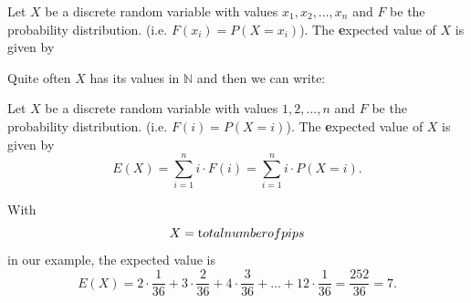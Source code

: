 \documentclass[twoside,11pt,a4paper]{article}
\newif\ifEN \ENtrue	                %
\def\tr|#1|#2|{\ifEN #2\else #1\fi}     %
\newenvironment{ttile}[1]{\begin{tcolorbox}[colback=tile,sharp corners,title=#1]}{\end{tcolorbox}}
\def\N{\mathbb{N}}
\def\vsp{\vspace{5mm}}
\theoremstyle{definition}
\begin{document}
\begin{ttile}{\tr|Erwartungswert|Expected value|}
  \tr|Sei $X$ eine diskrete Zufallsvariable mit den Werten $x_1,x_2,\ldots, x_n$ 
   und $F$ ihre Verteilungsfunktion (d.h. $F(x_i)=P(X=x_i)$). Der \textbf{Erwartungswert} von $X$ is dann definiert durch
|Let $X$ be a discrete random variable with values $x_1,x_2,\ldots, x_n$ 
and $F$ be the probability distribution. (i.e.  $F(x_i)=P(X=x_i)$). The \textbf{expected value} of $X$  is given by|
\end{ttile}

\tr|Oft hat $X$ Werte in $\N$ und dann kann man die Definition einfacher schreiben: 
|Quite often $X$ has its values in $\N$ and then we can write: |
\begin{ttile}{\tr|Erwartungswert vereinfacht|Expected value simpliefied|}
  \tr|Sei $X$ eine diskrete Zufallsvariable mit den Werten $1,2,\ldots, n$ 
   und $F$ ihre Verteilungsfunktion (d.h. $F(i)=P(X=i)$). Der \textbf{Erwartungswert} von $X$ is dann definiert durch
|Let $X$ be a discrete random variable with values $1,2,\ldots, n$ 
and $F$ be the probability distribution. (i.e.  $F(i)=P(X=i)$). The \textbf{expected value} of $X$  is given by|
\[
E(X) = \sum_{i=1}^n i\cdot F(i)=\sum_{i=1}^n i\cdot P(X=i).
\]
\end{ttile}

\vsp\vsp
\tr|Mit $$X=\text{Augensumme}$$ w"are in unserem Beispiel  der Erwartungswert also| With $$X=\text{total number of pips}$$ in our example, the expected value is |
\[
E(X)=2\cdot \frac{1}{36}+3\cdot \frac{2}{36} + 4\cdot \frac{3}{36} + \ldots + 12\cdot \frac{1}{36} = \frac{252}{36}=7.
\]
\end{document}
